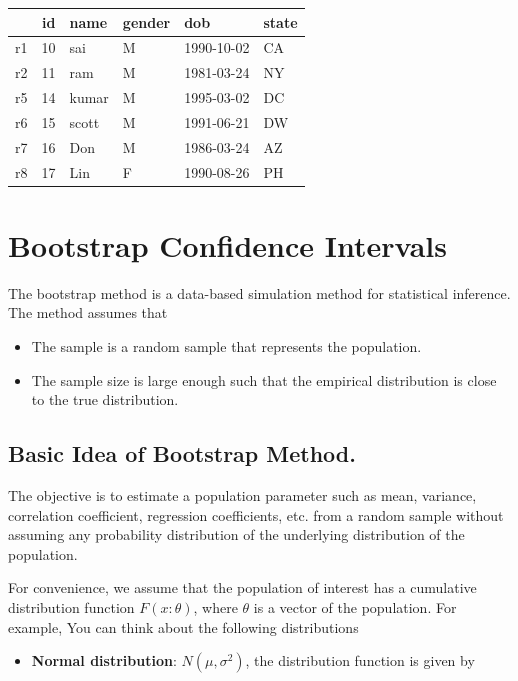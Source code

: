 \documentclass[
]{book}
\providecommand{\tightlist}{%
  \setlength{\itemsep}{0pt}\setlength{\parskip}{0pt}}
\begin{document}
\begin{tabular}{l|r|l|l|l|l}
\hline
  & id & name & gender & dob & state\\
\hline
r1 & 10 & sai & M & 1990-10-02 & CA\\
\hline
r2 & 11 & ram & M & 1981-03-24 & NY\\
\hline
r5 & 14 & kumar & M & 1995-03-02 & DC\\
\hline
r6 & 15 & scott & M & 1991-06-21 & DW\\
\hline
r7 & 16 & Don & M & 1986-03-24 & AZ\\
\hline
r8 & 17 & Lin & F & 1990-08-26 & PH\\
\hline
\end{tabular}

\hypertarget{bootstrap-confidence-intervals}{%
\chapter{Bootstrap Confidence Intervals}\label{bootstrap-confidence-intervals}}

The bootstrap method is a data-based simulation method for statistical inference. The method assumes that

\begin{itemize}
\tightlist
\item
  The sample is a random sample that represents the population.
\item
  The sample size is large enough such that the empirical distribution is close to the true distribution.
\end{itemize}

\hypertarget{basic-idea-of-bootstrap-method.}{%
\section{Basic Idea of Bootstrap Method.}\label{basic-idea-of-bootstrap-method.}}

The objective is to estimate a population parameter such as mean, variance, correlation coefficient, regression coefficients, etc. from a random sample without assuming any probability distribution of the underlying distribution of the population.

For convenience, we assume that the population of interest has a cumulative distribution function \(F(x: \theta)\), where \(\theta\) is a vector of the population. For example, You can think about the following distributions

\begin{itemize}
\tightlist
\item
  \textbf{Normal distribution}: \(N(\mu, \sigma^2)\), the distribution function is given by
\end{itemize}
\end{document}
